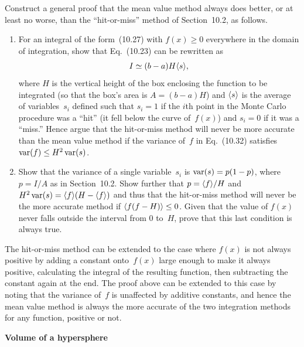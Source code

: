 \documentclass[12pt]{article}
\begin{document}
\begin{exercises}
\exercise Construct a general proof that the mean value method always does
better, or at least no worse, than the ``hit-or-miss'' method of
Section~10.2, as follows.
\begin{enumerate}\setlength{\itemsep}{0pt}
\item For an integral of the form~(10.27) with $f(x)\ge0$ everywhere in the
  domain of integration, show that Eq.~(10.23) can be rewritten as
\begin{displaymath}
I \simeq (b-a) H\langle s\rangle,
\end{displaymath}
where $H$ is the vertical height of the box enclosing the function to be
integrated (so that the box's area is $A=(b-a)H$) and $\langle s\rangle$ is the
average of variables~$s_i$ defined such that $s_i=1$ if the $i$th point in
the Monte Carlo procedure was a ``hit'' (it fell below the curve of~$f(x)$)
and $s_i=0$ if it was a ``miss.''  Hence argue that the hit-or-miss method
will never be more accurate than the mean value method if the variance
of~$f$ in Eq.~(10.32) satisfies $\mathop\mathrm{var}(f) \le H^2\mathop\mathrm{var}(s)$.
\item Show that the variance of a single variable~$s_i$ is $\mathop\mathrm{var}(s) =
  p(1-p)$, where $p=I/A$ as in Section~10.2.  Show further that
  $p=\langle f\rangle/H$ and $H^2\mathop\mathrm{var}(s) = \langle f\rangle(H-\langle f\rangle)$ and thus that the
  hit-or-miss method will never be the more accurate method if
  $\langle f(f-H)\rangle\le0$.  Given that the value of $f(x)$ never falls outside
  the interval from 0 to~$H$, prove that this last condition is always
  true.
\end{enumerate}
The hit-or-miss method can be extended to the case where $f(x)$ is not
always positive by adding a constant onto~$f(x)$ large enough to make it
always positive, calculating the integral of the resulting function, then
subtracting the constant again at the end.  The proof above can be extended
to this case by noting that the variance of~$f$ is unaffected by additive
constants, and hence the mean value method is always the more accurate of
the two integration methods for any function, positive or not.



\exercise \textbf{Volume of a hypersphere}


\end{exercises}
\end{document}
